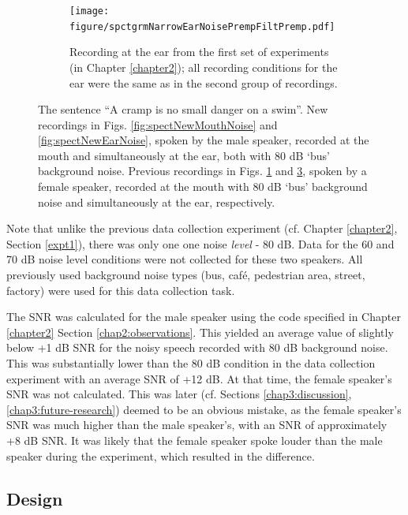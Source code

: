 \begin{figure}[h!]
\begin{subfigure}{0.45\textwidth}
  \label{fig:spectOldMouthNoise}
\end{subfigure}
\qquad
\begin{subfigure}{0.45\textwidth}
  \centering
  \texttt{[image: figure/spctgrmNarrowEarNoisePrempFiltPremp.pdf]}
  \caption{Recording at the ear from the first set of experiments (in Chapter \ref{chapter2}); all recording conditions for the ear were the same as in the second group of recordings.}
  \label{fig:spectOldEarNoise}
\end{subfigure}
\caption{The sentence ``A cramp is no small danger on a swim''. New recordings in Figs. \ref{fig:spectNewMouthNoise} and \ref{fig:spectNewEarNoise}, spoken by the male speaker, recorded at the mouth and simultaneously at the ear, both with 80 dB `bus' background noise.  Previous recordings in Figs. \ref{fig:spectOldMouthNoise} and \ref{fig:spectOldEarNoise}, spoken by a female speaker, recorded at the mouth with 80 dB `bus' background noise and simultaneously at the ear, respectively.}
\end{figure}

Note that unlike the previous data collection experiment (cf. Chapter \ref{chapter2}, Section \ref{expt1}), there was only one one noise \textit{level} - 80 dB.  Data for the 60 and 70 dB noise level conditions were not collected for these two speakers.  All previously used background noise types (bus, caf\'{e}, pedestrian area, street, factory) were used for this data collection task.

The SNR was calculated for the male speaker using the code specified in Chapter \ref{chapter2} Section \ref{chap2:observations}.  This yielded an average value of slightly below +1 dB SNR for the noisy speech recorded with 80 dB background noise.  This was substantially lower than the 80 dB condition in the data collection experiment with an average SNR of +12 dB.  At that time, the female speaker's SNR was not calculated.  This was later (cf. Sections \ref{chap3:discussion}, \ref{chap3:future-research}) deemed to be an obvious mistake, as the female speaker's SNR was much higher than the male speaker's, with an SNR of approximately +8 dB SNR.  It was likely that the female speaker spoke louder than the male speaker during the experiment, which resulted in the difference.


\subsection{Design}
\label{chap3:methods:design}

